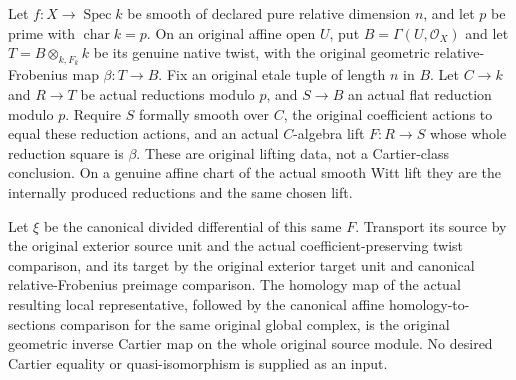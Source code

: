 \begin{theorem}
\label{thm:di-geometric-original-leading-cartier-one}
\leanok
Let $f:X\to\operatorname{Spec}k$ be smooth of declared pure relative
dimension $n$, and let $p$ be prime with $\operatorname{char}k=p$.
On an original affine open $U$, put $B=\Gamma(U,\mathcal O_X)$ and let
$T=B\otimes_{k,F_k}k$ be its genuine native twist, with the original
geometric relative-Frobenius map $\beta:T\to B$. Fix an original etale
tuple of length $n$ in $B$. Let $C\to k$ and $R\to T$ be actual
reductions modulo $p$, and $S\to B$ an actual flat reduction modulo $p$.
Require $S$ formally smooth over $C$, the original coefficient actions
to equal these reduction actions, and an actual $C$-algebra lift
$F:R\to S$ whose whole reduction square is $\beta$. These are original
lifting data, not a Cartier-class conclusion. On a genuine affine chart
of the actual smooth Witt lift they are the internally produced
reductions and the same chosen lift.

Let $\xi$ be the canonical divided differential of this same $F$.
Transport its source by the original exterior source unit and the
actual coefficient-preserving twist comparison, and its target by the
original exterior target unit and canonical relative-Frobenius
preimage comparison. The homology map of the actual resulting local
representative, followed by the canonical affine homology-to-sections
comparison for the same original global complex, is the original
geometric inverse Cartier map on the whole original source module.
No desired Cartier equality or quasi-isomorphism is supplied as an input.
\end{theorem}
